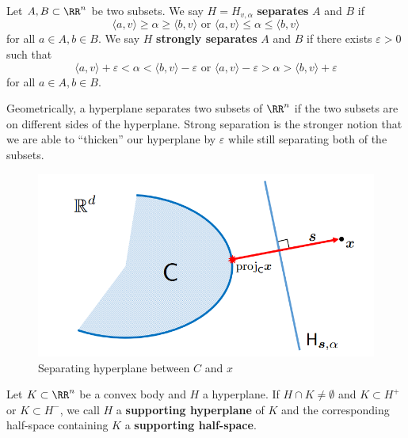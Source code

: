 \documentclass[11pt]{article}
\begin{document}
\begin{defn}
    Let $A, B \subset \RR^n$ be two subsets. We say $H = H_{v, \alpha}$ \textbf{separates} $A$ and $B$ if 
    \[
        \langle a, v \rangle \geq \alpha \geq \langle b, v \rangle \text{ or } \langle a, v \rangle \leq \alpha \leq \langle b, v \rangle
    \] 
    for all $a \in A, b \in B$. We say $H$ \textbf{strongly separates} $A$ and $B$ if there exists $\varepsilon > 0$ such that 
    \[
        \langle a, v \rangle + \varepsilon < \alpha < \langle b, v \rangle - \varepsilon \text{ or } \langle a, v \rangle - \varepsilon > \alpha > \langle b, v \rangle + \varepsilon
    \]
    for all $a \in A, b \in B$. 
\end{defn}
Geometrically, a hyperplane separates two subsets of $\RR^n$ if the two subsets are on different sides of the hyperplane. Strong separation is the stronger notion that we are able to ``thicken'' our hyperplane by $\varepsilon$ while still separating both of the subsets.
\begin{figure}[h]
    \begin{center}
        \includegraphics[scale = 0.4]{../images/image4.png}
        \caption{Separating hyperplane between $C$ and $x$}
    \end{center}
\end{figure}

\begin{defn}
    Let $K \subset \RR^n$ be a convex body and $H$ a hyperplane. If $H \cap K \neq \emptyset$ and $K \subset H^+$ or $K \subset H^-$, we call $H$ a \textbf{supporting hyperplane} of $K$ and the corresponding half-space containing $K$ a \textbf{supporting half-space}.
\end{defn}
\end{document}
